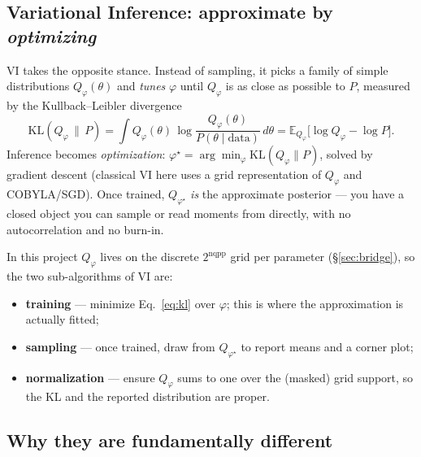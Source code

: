 \documentclass[11pt]{article}
\newcommand{\KL}{\mathrm{KL}}
\begin{document}
\subsection{Variational Inference: approximate by \emph{optimizing}}

VI takes the opposite stance. Instead of sampling, it picks a family of simple
distributions $Q_\varphi(\theta)$ and \emph{tunes} $\varphi$ until $Q_\varphi$
is as close as possible to $P$, measured by the Kullback--Leibler divergence
\begin{equation}
\KL(Q_\varphi\,\|\,P) = \int Q_\varphi(\theta)\,
\log\frac{Q_\varphi(\theta)}{P(\theta\mid\mathrm{data})}\,d\theta
= \mathbb{E}_{Q_\varphi}\!\big[\log Q_\varphi - \log P\big].
\label{eq:kl}
\end{equation}
Inference becomes \emph{optimization}: $\varphi^\star=\arg\min_\varphi
\KL(Q_\varphi\|P)$, solved by gradient descent (classical VI here uses a grid
representation of $Q_\varphi$ and COBYLA/SGD). Once trained, $Q_{\varphi^\star}$
\emph{is} the approximate posterior --- you have a closed object you can sample
or read moments from directly, with no autocorrelation and no burn-in.

In this project $Q_\varphi$ lives on the discrete $2^{\mathrm{nqpp}}$ grid per
parameter (\S\ref{sec:bridge}), so the two sub-algorithms of VI are:
\begin{itemize}[nosep]
\item \textbf{training} --- minimize Eq.~\ref{eq:kl} over $\varphi$; this is
where the approximation is actually fitted;
\item \textbf{sampling} --- once trained, draw from $Q_{\varphi^\star}$ to
report means and a corner plot;
\item \textbf{normalization} --- ensure $Q_\varphi$ sums to one over the
(masked) grid support, so the KL and the reported distribution are proper.
\end{itemize}

\subsection{Why they are fundamentally different}
\end{document}
